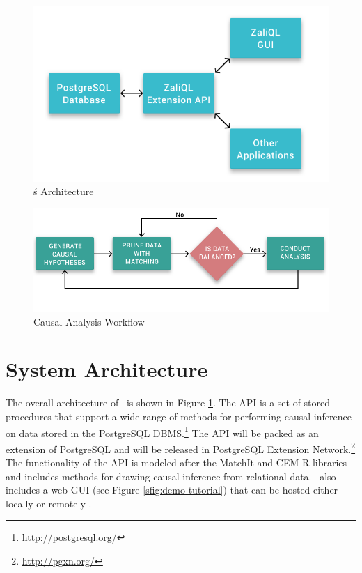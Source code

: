 
\begin{figure}
 \includegraphics[scale=0.25]{Figures/System-Overview.png}
 \caption{\GSQLB\'s Architecture}
  \label{fig:arch}
  \vspace{-3mm}
\end{figure}


\begin{figure}
  \includegraphics[scale=0.25]{Figures/Matching-Flowchart.png}
\caption{Causal Analysis Workflow}
\label{fig:flowchart}
\vspace{-0.3cm}
\end{figure}



\section{System Architecture}

The overall architecture of \GSQL\ is shown in Figure \ref{fig:arch}.
The API is a set of stored procedures that support a wide
range of methods for performing causal inference on data stored in the
PostgreSQL DBMS.\footnote{\url{http://postgresql.org/}}
The API will be packed  as an extension of  PostgreSQL and will be released in
PostgreSQL Extension Network.\footnote{\url{http://pgxn.org/}}
The functionality of the API is modeled after the MatchIt and CEM R
libraries \cite{ho2005,iacus2009cem} and includes methods for drawing causal inference from relational data. \GSQL\ also includes a web GUI
(see Figure \ref{sfig:demo-tutorial}) that can be hosted either locally or
remotely . %

